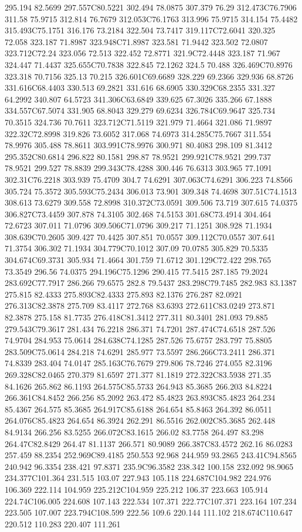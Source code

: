 295.194 82.5699 297.557C80.5221 302.494 78.0875 307.379 76.29 312.473C76.7906 311.58 75.9715 312.814 76.7679 312.053C76.1763 313.996 75.9715 314.154 75.4482 315.493C75.1751 316.176 73.2184 322.504 73.7417 319.117C72.6041 320.325 72.058 323.187 71.8987 323.948C71.8987 323.581 71.9442 323.502 72.0807 323.712C72.24 323.056 72.513 322.452 72.8771 321.9C72.4448 323.187 71.967 324.447 71.4437 325.655C70.7838 322.845 72.1262 324.5 70.488 326.469C70.8976 323.318 70.7156 325.13 70.215 326.601C69.6689 328.229 69.2366 329.936 68.8726 331.616C68.4403 330.513 69.2821 331.616 68.6905 330.329C68.2355 331.327 64.2992 340.807 64.5723 341.306C63.6849 339.625 67.3026 335.266 67.1888 334.557C67.5074 331.905 68.8043 329.279 69.6234 326.784C69.9647 325.734 70.3515 324.736 70.7611 323.712C71.5119 321.979 71.4664 321.086 71.9897 322.32C72.8998 319.826 73.6052 317.068 74.6973 314.285C75.7667 311.554 78.9976 305.488 78.8611 303.991C78.9976 300.971 80.4083 298.109 81.3412 295.352C80.6814 296.822 80.1581 298.87 78.9521 299.921C78.9521 299.737 78.9521 299.527 78.8839 299.343C78.4288 300.446 76.6313 303.965 77.1091 302.31C76.2218 303.939 75.4709 304.7 74.6291 307.063C74.6291 306.223 74.8566 305.724 75.3572 305.593C75.2434 306.013 73.901 309.348 74.4698 307.51C74.1513 308.613 73.6279 309.558 72.8998 310.372C73.0591 309.506 73.719 307.615 74.0375 306.827C73.4459 307.878 74.3105 302.468 74.5153 301.68C73.4914 304.464 72.6723 307.011 71.0796 309.506C71.0796 309.217 71.1251 308.928 71.1934 308.639C70.2605 309.427 70.4425 307.851 70.0557 309.112C70.0557 307.641 71.3754 306.302 71.1934 304.779C70.1012 307.09 70.0785 305.829 70.5335 304.674C69.3731 305.934 71.4664 301.759 71.6712 301.129C72.422 298.765 73.3549 296.56 74.0375 294.196C75.1296 290.415 77.5415 287.185 79.2024 283.692C77.7917 286.266 79.6575 282.8 79.5437 283.298C79.7485 282.983 83.1387 275.815 82.4333 275.893C82.4333 275.893 82.1376 276.287 82.0921 276.313C82.3878 275.709 83.4117 272.768 83.6393 272.611C83.0249 273.871 82.3878 275.158 81.7735 276.418C81.3412 277.311 80.3401 281.093 79.885 279.543C79.3617 281.434 76.2218 286.371 74.7201 287.474C74.6518 287.526 74.9704 284.953 75.0614 284.638C74.1285 287.526 75.6757 283.797 75.8805 283.509C75.0614 284.218 74.6291 285.977 73.5597 286.266C73.2411 286.371 74.8339 283.404 74.0147 285.163C76.7679 279.806 78.7246 274.055 82.3196 269.328C82.0465 270.379 81.6597 271.377 81.1819 272.322C83.5938 271.35 84.1626 265.862 86.1193 264.575C85.5733 264.943 85.3685 266.203 84.8224 266.361C84.8452 266.256 85.2092 263.472 85.4823 263.893C85.4823 264.234 85.4367 264.575 85.3685 264.917C85.6188 264.654 85.8463 264.392 86.0511 264.076C85.4823 264.654 86.3924 262.291 86.5516 262.002C85.3685 262.448 84.9134 266.256 83.5255 266.072C83.1615 266.02 83.7758 264.497 83.298 264.47C82.8429 264.47 81.1137 266.571 80.9089 266.387C83.4572 262.16 86.0283 257.459 88.2354 252.969C89.4185 250.553 92.968 244.959 93.2865 243.41C94.8565 240.942 96.3354 238.421 97.8371 235.9C96.3582 238.342 100.158 232.092 98.9065 234.377C101.364 231.515 103.07 227.943 105.118 224.687C104.982 224.976 106.369 222.114 104.959 225.212C104.959 225.212 106.37 223.663 105.914 224.74C106.005 224.608 107.143 222.534 107.371 222.77C107.371 223.164 107.234 223.505 107.007 223.794C108.599 222.56 109.6 220.144 111.102 218.674C110.647 220.512 110.283 220.407 111.261 